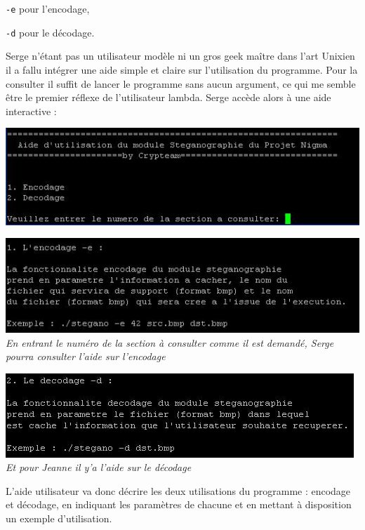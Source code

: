 \documentclass[a4paper,12pt]{article}
\begin{document}
\texttt{-e} pour l'encodage,

\texttt{-d} pour le décodage.

Serge n'étant pas un utilisateur modèle ni un gros geek maître dans l'art Unixien il a fallu intégrer une aide simple et claire sur l'utilisation du programme. Pour la consulter il suffit de lancer le programme sans aucun argument, ce qui me semble être le premier réflexe de l'utilisateur lambda. Serge accède alors à une aide interactive :

\begin{center}	
  \includegraphics[scale=0.75]{aide1.JPG}
\end{center}

\begin{center}	
  \includegraphics[scale=0.75]{aide3.JPG}
  \textit{\\En entrant le numéro de la section à consulter comme il est demandé, Serge pourra consulter l'aide sur l'encodage}
\end{center}

\begin{center}	
  \includegraphics[scale=0.75]{aide2.JPG}
  \textit{\\Et pour Jeanne il y'a l'aide sur le décodage}
\end{center}

L'aide utilisateur va donc décrire les deux utilisations du programme : encodage et décodage, en indiquant les paramètres de chacune et en mettant à disposition un exemple d'utilisation.
\end{document}
